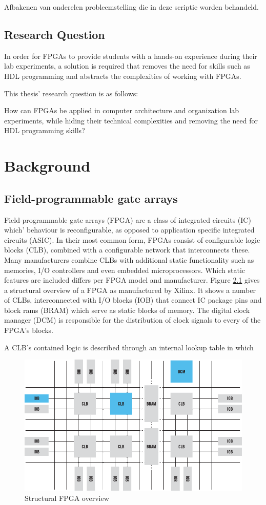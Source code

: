 \documentclass[openright]{uva-bachelor-thesis}
\begin{document}
Afbakenen van onderelen probleemstelling die in deze scriptie worden behandeld.


\section{Research Question}

In order for FPGAs to provide students with a hands-on experience during their lab experiments, a solution is required 
that removes the need for skills such as HDL programming and abstracts the complexities of working with FPGAs.

This thesis' research question is as follows: 

\begin{displayquote}
How can FPGAs be applied in computer architecture and organization lab experiments, while hiding their technical complexities and removing the need for HDL programming skills?
\end{displayquote}

\chapter{Background}

\section{Field-programmable gate arrays}
Field-programmable gate arrays (FPGA) are a class of integrated circuits (IC) which' behaviour is reconfigurable, as opposed to application specific integrated circuits (ASIC). In their most common form, FPGAs consist of configurable logic blocks (CLB), combined with a configurable network that interconnects these. Many manufacturers combine CLBs with additional static functionality such as memories, I/O controllers and even embedded microprocessors. Which static features are included differs per FPGA model and manufacturer. Figure \ref{fig:fpgastructure} gives a structural overview of a FPGA as manufactured by Xilinx. It shows a number of CLBs, interconnected with I/O blocks (IOB) that connect IC package pins and block rams (BRAM) which serve as static blocks of memory. The digital clock manager (DCM) is responsible for the distribution of clock signals to every of the FPGA's blocks. 

A CLB's contained logic is described through an internal lookup table in which 

\begin{figure}
\centering
\includegraphics[width=.7\textwidth]{fpga-block-structure}
\caption{Structural FPGA overview \cite{xilinxFPGA}}
\label{fig:fpgastructure}
\end{figure}
\end{document}
